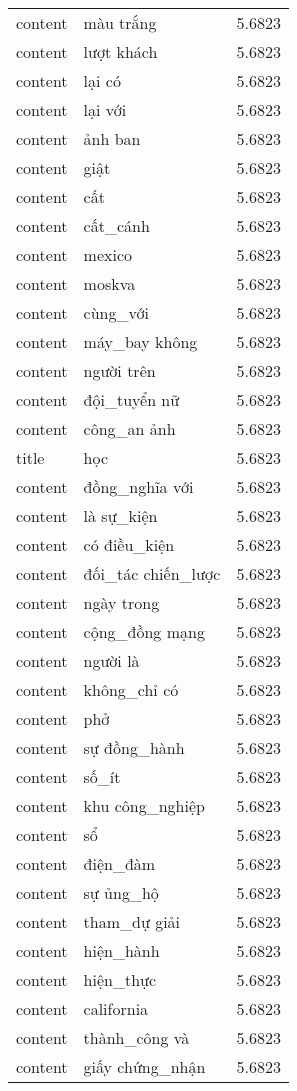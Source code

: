 \documentclass{article}
\begin{document}
\begin{tabular}{lll}
content & màu trắng & 5.6823\\
content & lượt khách & 5.6823\\
content & lại có & 5.6823\\
content & lại với & 5.6823\\
content & ảnh ban & 5.6823\\
content & giật & 5.6823\\
content & cất & 5.6823\\
content & cất\_cánh & 5.6823\\
content & mexico & 5.6823\\
content & moskva & 5.6823\\
content & cùng\_với & 5.6823\\
content & máy\_bay không & 5.6823\\
content & người trên & 5.6823\\
content & đội\_tuyển nữ & 5.6823\\
content & công\_an ảnh & 5.6823\\
title & học & 5.6823\\
content & đồng\_nghĩa với & 5.6823\\
content & là sự\_kiện & 5.6823\\
content & có điều\_kiện & 5.6823\\
content & đối\_tác chiến\_lược & 5.6823\\
content & ngày trong & 5.6823\\
content & cộng\_đồng mạng & 5.6823\\
content & người là & 5.6823\\
content & không\_chỉ có & 5.6823\\
content & phở & 5.6823\\
content & sự đồng\_hành & 5.6823\\
content & số\_ít & 5.6823\\
content & khu công\_nghiệp & 5.6823\\
content & sổ & 5.6823\\
content & điện\_đàm & 5.6823\\
content & sự ủng\_hộ & 5.6823\\
content & tham\_dự giải & 5.6823\\
content & hiện\_hành & 5.6823\\
content & hiện\_thực & 5.6823\\
content & california & 5.6823\\
content & thành\_công và & 5.6823\\
content & giấy chứng\_nhận & 5.6823\\

\end{tabular}
\end{document}
